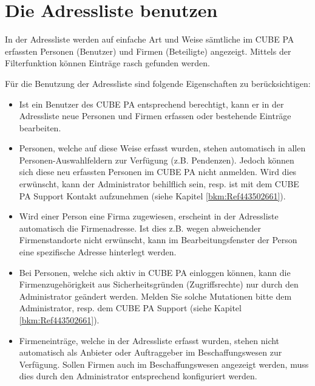 
\clearpage
\section{Die Adressliste benutzen}
\label{bkm:Ref443738751}
In der Adressliste werden auf einfache Art und Weise sämtliche im CUBE PA erfassten Personen (Benutzer) und Firmen (Beteiligte) angezeigt. Mittels der Filterfunktion können Einträge rasch gefunden werden.

\vspace{\baselineskip}

Für die Benutzung der Adressliste sind folgende Eigenschaften zu berücksichtigen:

\begin{itemize}
\item
Ist ein Benutzer des CUBE PA entsprechend berechtigt, kann er in der Adressliste neue Personen und Firmen erfassen oder bestehende Einträge bearbeiten.

\item
Personen, welche auf diese Weise erfasst wurden, stehen automatisch in allen Personen-Auswahlfeldern zur Verfügung (z.B. Pendenzen). Jedoch können sich diese neu erfassten Personen im CUBE PA nicht anmelden. Wird dies erwünscht, kann der Administrator behilflich sein, resp. ist mit dem CUBE PA Support Kontakt aufzunehmen (siehe Kapitel
\ref{bkm:Ref443502661}).

\item
Wird einer Person eine Firma zugewiesen, erscheint in der Adressliste automatisch die Firmenadresse. Ist dies z.B. wegen abweichender Firmenstandorte nicht erwünscht, kann im Bearbeitungsfenster der Person eine spezifische Adresse
hinterlegt werden.

\item
Bei Personen, welche sich aktiv in CUBE PA einloggen können, kann die Firmenzugehörigkeit aus Sicherheitsgründen (Zugriffsrechte) nur durch den Administrator geändert werden. Melden Sie solche Mutationen bitte dem Administrator, resp. dem CUBE PA Support (siehe Kapitel \ref{bkm:Ref443502661}).

\item
Firmeneinträge, welche in der Adressliste erfasst wurden, stehen nicht automatisch als Anbieter oder Auftraggeber im Beschaffungswesen zur Verfügung. Sollen Firmen auch im Beschaffungswesen angezeigt werden, muss dies durch den Administrator entsprechend konfiguriert werden.
\end{itemize}

